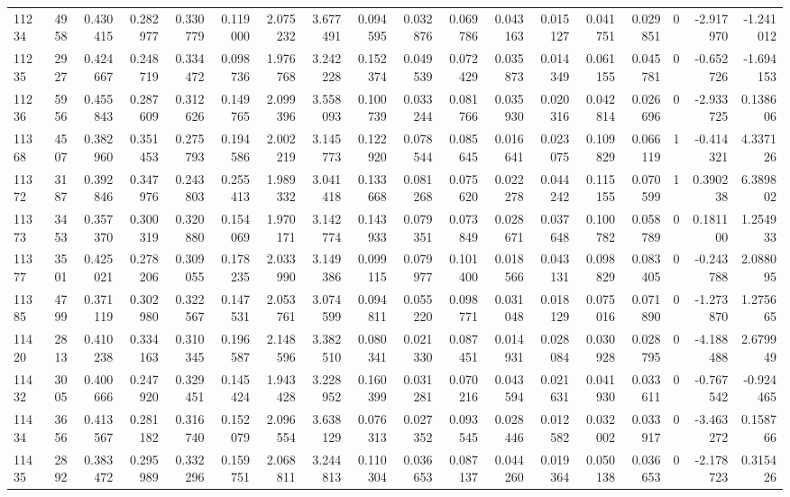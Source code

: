 \begin{tabular}{lrrrrrrrrrrrrrrrrr}
11234 & 4958 & 0.430415 & 0.282977 & 0.330779 & 0.119000 & 2.075232 & 3.677491 & 0.094595 & 0.032876 & 0.069786 & 0.043163 & 0.015127 & 0.041751 & 0.029851 & 0 & -2.917970 & -1.241012 \\
11235 & 2927 & 0.424667 & 0.248719 & 0.334472 & 0.098736 & 1.976768 & 3.242228 & 0.152374 & 0.049539 & 0.072429 & 0.035873 & 0.014349 & 0.061155 & 0.045781 & 0 & -0.652726 & -1.694153 \\
11236 & 5956 & 0.455843 & 0.287609 & 0.312626 & 0.149765 & 2.099396 & 3.558093 & 0.100739 & 0.033244 & 0.081766 & 0.035930 & 0.020316 & 0.042814 & 0.026696 & 0 & -2.933725 & 0.138606 \\
11368 & 4507 & 0.382960 & 0.351453 & 0.275793 & 0.194586 & 2.002219 & 3.145773 & 0.122920 & 0.078544 & 0.085645 & 0.016641 & 0.023075 & 0.109829 & 0.066119 & 1 & -0.414321 & 4.337126 \\
11372 & 3187 & 0.392846 & 0.347976 & 0.243803 & 0.255413 & 1.989332 & 3.041418 & 0.133668 & 0.081268 & 0.075620 & 0.022278 & 0.044242 & 0.115155 & 0.070599 & 1 & 0.390238 & 6.389802 \\
11373 & 3453 & 0.357370 & 0.300319 & 0.320880 & 0.154069 & 1.970171 & 3.142774 & 0.143933 & 0.079351 & 0.073849 & 0.028671 & 0.037648 & 0.100782 & 0.058789 & 0 & 0.181100 & 1.254933 \\
11377 & 3501 & 0.425021 & 0.278206 & 0.309055 & 0.178235 & 2.033990 & 3.149386 & 0.099115 & 0.079977 & 0.101400 & 0.018566 & 0.043131 & 0.098829 & 0.083405 & 0 & -0.243788 & 2.088095 \\
11385 & 4799 & 0.371119 & 0.302980 & 0.322567 & 0.147531 & 2.053761 & 3.074599 & 0.094811 & 0.055220 & 0.098771 & 0.031048 & 0.018129 & 0.075016 & 0.071890 & 0 & -1.273870 & 1.275665 \\
11420 & 2813 & 0.410238 & 0.334163 & 0.310345 & 0.196587 & 2.148596 & 3.382510 & 0.080341 & 0.021330 & 0.087451 & 0.014931 & 0.028084 & 0.030928 & 0.028795 & 0 & -4.188488 & 2.679949 \\
11432 & 3005 & 0.400666 & 0.247920 & 0.329451 & 0.145424 & 1.943428 & 3.228952 & 0.160399 & 0.031281 & 0.070216 & 0.043594 & 0.021631 & 0.041930 & 0.033611 & 0 & -0.767542 & -0.924465 \\
11434 & 3656 & 0.413567 & 0.281182 & 0.316740 & 0.152079 & 2.096554 & 3.638129 & 0.076313 & 0.027352 & 0.093545 & 0.028446 & 0.012582 & 0.032002 & 0.033917 & 0 & -3.463272 & 0.158766 \\
11435 & 2892 & 0.383472 & 0.295989 & 0.332296 & 0.159751 & 2.068811 & 3.244813 & 0.110304 & 0.036653 & 0.087137 & 0.044260 & 0.019364 & 0.050138 & 0.036653 & 0 & -2.178723 & 0.315426 \\

\end{tabular}
